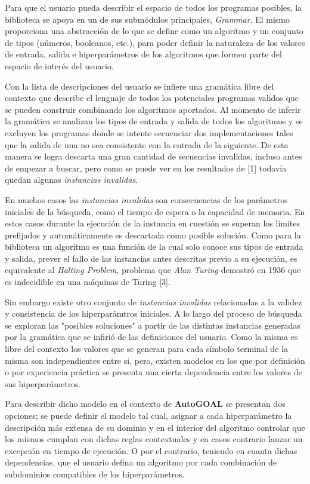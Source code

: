 Para que el usuario pueda describir el espacio de todos los programas posibles,
la biblioteca se apoya en un de sus submódulos principales, {\it Grammar}. El mismo
proporciona una abstracción de lo que se define como un algoritmo y un conjunto
de tipos (números, booleanos, etc.), para poder definir la naturaleza de los
valores de entrada, salida e hiperparámetros de los algoritmos que formen parte
del espacio de interés del usuario.

Con la lista de descripciones del usuario se infiere una gramática libre
del contexto que describe el lenguaje de todos los potenciales programas validos
que se pueden construir combinando los algoritmos aportados. Al momento de inferir
la gramática se analizan los tipos de entrada y salida de todos los algoritmos y se
excluyen los programas donde se intente secuenciar dos implementaciones tales que
la salida de una no sea consistente con la entrada de la siguiente. De esta
manera se logra descarta una gran cantidad de secuencias invalidas, incluso
antes de empezar a buscar, pero como se puede ver en los resultados de [1]
todavía quedan algunas {\it instancias invalidas}.

En muchos casos las {\it instancias invalidas} son consecuencias de los
parámetros iniciales de la búsqueda, como el tiempo de espera o la capacidad de memoria.
En estos casos durante la ejecución de la instancia en cuestión se superan los límites
prefijados y automáticamente es descartada como posible solución. Como para la
biblioteca un algoritmo es una función de la cual solo conoce sus tipos de entrada y
salida, prever el fallo de las instancias antes descritas previo a su ejecución,
es equivalente al {\it Halting Problem}, problema que {\it Alan Turing} demostró en 1936
que es indecidible en una máquinas de Turing [3].

Sin embargo existe otro conjunto de {\it instancias invalidas} relacionadas a la validez
y consistencia de los hiperparámtros iniciales. A lo largo del proceso de búsqueda
se exploran las "posibles soluciones" a partir de las distintas instancias generadas
por la gramática que se infirió de las definiciones del usuario. Como la misma
es libre del contexto los valores que se generan para cada símbolo terminal de la misma
son independientes entre si, pero, existen modelos en los que por definición o por
experiencia práctica se presenta una cierta dependencia entre los valores de sus
hiperparámetros.

Para describir dicho modelo en el contexto de {\bf AutoGOAL} se presentan dos opciones;
se puede definir el modelo tal cual, asignar a cada hiperparámetro la descripción
más extensa de su dominio y en el interior del algoritmo controlar que los mismos
cumplan con dichas reglas contextuales y en casos contrario lanzar un excepción en
tiempo de ejecución. O por el contrario, teniendo en cuanta dichas dependencias,
que el usuario defina un algoritmo por cada combinación de subdominios compatibles
de los hiperparámetros.

